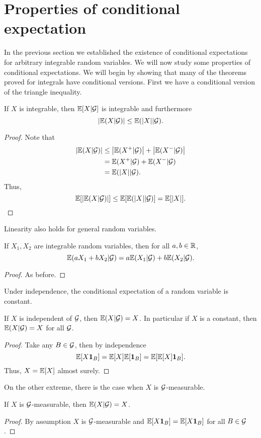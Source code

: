 \section{Properties of conditional expectation}
In the previous section we established the existence of conditional expectations for arbitrary integrable random variables. We will now study some properties of conditional expectations. We will begin by showing that many of the theorems proved for integrals have conditional versions. First we have a conditional version of the triangle inequality.
\begin{proposition}
    If $X$ is integrable, then ${\mathbb{E}}[X|{\mathcal{G}}]$ is integrable and furthermore 
    \[{\left\lvert{\mathbb{E}}(X|{\mathcal{G}})\right\rvert}\le {\mathbb{E}}({\left\lvert X\right\rvert}|{\mathcal{G}}). \]
\end{proposition}
\begin{proof}
    Note that
    \begin{align*}
        {\left\lvert{\mathbb{E}}(X|{\mathcal{G}})\right\rvert} &\le {\left\lvert{\mathbb{E}}(X^+|{\mathcal{G}})\right\rvert}+{\left\lvert{\mathbb{E}}(X^-|{\mathcal{G}})\right\rvert}\\
        &={\mathbb{E}}(X^+|{\mathcal{G}})+{\mathbb{E}}(X^-|{\mathcal{G}})\\
        &={\mathbb{E}}({\left\lvert X\right\rvert}|{\mathcal{G}}).
    \end{align*}
    Thus,
    \[{\mathbb{E}}[{\left\lvert{\mathbb{E}}(X|{\mathcal{G}})\right\rvert}] \le {\mathbb{E}}[{\mathbb{E}}({\left\lvert X\right\rvert}|{\mathcal{G}})]={\mathbb{E}}[{\left\lvert X\right\rvert}]. \qedhere \]
\end{proof}
Linearity also holds for general random variables.
\begin{proposition}
    If $X_1,X_2$ are integrable random variables, then for all $a,b \in {\mathbb R}$,
    \[{\mathbb{E}}(aX_1+bX_2|{\mathcal{G}})=a{\mathbb{E}}(X_1|{\mathcal{G}})+b{\mathbb{E}}(X_2|{\mathcal{G}}).\]
\end{proposition}
\begin{proof}
    As before.
\end{proof}
Under independence, the conditional expectation of a random variable is constant.
\begin{proposition}
    If $X$ is independent of ${\mathcal{G}}$, then ${\mathbb{E}}(X|{\mathcal{G}})=X$. In particular if $X$ is a constant, then ${\mathbb{E}}(X|{\mathcal{G}})=X$ for all ${\mathcal{G}}$.
\end{proposition}
\begin{proof}
    Take any $B \in {\mathcal{G}}$, then by independence
    \[{\mathbb{E}}[X{{\bf 1}}_B] = {\mathbb{E}}[X]{\mathbb{E}}[{{\bf 1}}_B]={\mathbb{E}}[{\mathbb{E}}[X]{{\bf 1}}_B].\]
    Thus, $X={\mathbb{E}}[X]$ almost surely.
\end{proof}
On the other extreme, there is the case when $X$ is ${\mathcal{G}}$-measurable.
\begin{proposition}
    If $X$ is ${\mathcal{G}}$-measurable, then ${\mathbb{E}}(X|{\mathcal{G}})=X$.
\end{proposition}
\begin{proof}
    By assumption $X$ is ${\mathcal{G}}$-measurable and ${\mathbb{E}}[X{{\bf 1}}_B]={\mathbb{E}}[X{{\bf 1}}_B]$ for all $B \in {\mathcal{G}}$.
\end{proof}
